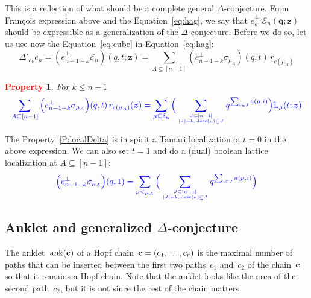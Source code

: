 \documentclass[12pt]{amsart}
\newcommand{\blue}[1]{\textcolor{blue}{#1}}
\newcommand{\red}[1]{\textcolor{red}{#1}}
\theoremstyle{plain}
\newtheorem{property}{\red{Property}}
\theoremstyle{definition}
\theoremstyle{remark}
\newcommand{\Qvar}{{\bm q}}
\newcommand{\Zvar}{{\bm z}}
\newcommand{\desc}{\mathop{\mathrm{desc}}}
\newcommand{\ank}{\mathop{\mathrm{ank}}}
\begin{document}
This is a reflection of what should be a complete general $\Delta$-conjecture.
From Fran\c{c}ois expression above and the Equation~\eqref{eq:hag}, we say that $e_{k}^{\perp_1}{\mathcal E}_n(\Qvar;\Zvar)$ should be expressible as a generalization of the $\Delta$-conjecture.
Before we do so, let us use 
now the Equation~\eqref{eq:cube} in Equation~\eqref{eq:hag}:
\begin{equation}\label{eq:deltacube}
\Delta'_{e_k} e_n = (e_{n-1-k}^{\perp_1}{\mathcal E}_n)(q,t;\Zvar)
= \sum_{A\subseteq [n-1]} ( e_{n-1-k}^\perp \sigma_{\mu_A} ) (q,t) \, r_{c(\mu_A)}
\end{equation}

\begin{property}\label{P:DeltaCube}
For $k\le n-1$
\[
\blue{
\sum_{A\subseteq [n-1]} \Big( e_{n-1-k}^\perp \sigma_{\mu_A} \Big) (q,t) \, r_{c(\mu_A)}(\Zvar)  = 
\sum_{\mu\subseteq\delta_n} \Big(\sum_{J\subseteq [n-1] \atop |J|=k, \,  \desc(\mu)\subseteq J} q^{\sum_{i\in J} a(\mu,i)}\Big) {\mathbb L}_\mu(t;\Zvar)
}
\]
\end{property}

The Property~\ref{P:localDelta} is in spirit a Tamari localization of $t=0$ in the above expression. We can also set $t=1$ and do a (dual) boolean lattice localization at $A\subseteq[n-1]$:
\begin{equation}\label{eq:cube_Delta_qt}
\blue{
\Big( e_{n-1-k}^\perp \sigma_{\mu_A} \Big) (q,1) = 
\sum_{\nu\le \mu_A} \Big(\sum_{J\subseteq [n-1] \atop |J|=k, \, \desc(\nu)\subseteq J} q^{\sum_{i\in J} a(\mu,i)}\Big)
}
\end{equation}

\subsection{Anklet and generalized $\Delta$-conjecture}

The anklet~$\ank({\bf c})$ of a Hopf chain~${\bf c} = (c_1, \dots, c_r)$ is the maximal number of paths that can be inserted between the first two paths~$c_1$ and~$c_2$ of the chain~${\bf c}$ so that it remains a Hopf chain.
Note that the anklet looks like the area of the second path~$c_2$, but it is not since the rest of the chain matters.
\end{document}
